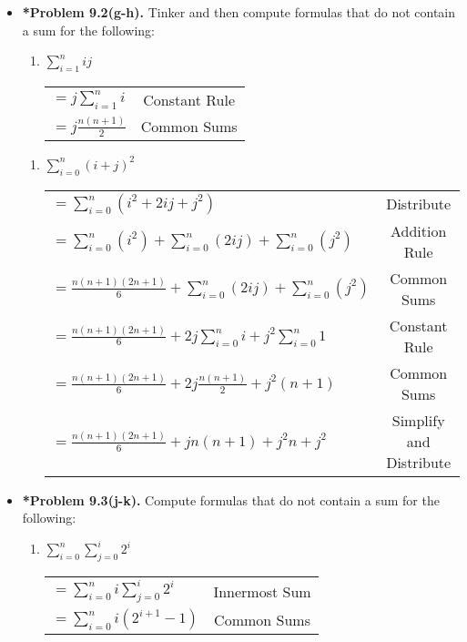 \documentclass[11pt]{article}
\begin{document}
\begin{itemize}
  \item \textbf{*Problem 9.2(g-h).} Tinker and then compute formulas that do not contain a sum for the following:
  \begin{enumerate}[label=(g)]
    \item $\displaystyle \sum_{i=1}^n ij$\\
    \begin{tabular}{l c}
      $= \displaystyle j\sum_{i=1}^n i$ & Constant Rule\\[0.25in]
      $= j \frac{n(n+1)}{2}$ & Common Sums
    \end{tabular}
  \end{enumerate}
  \begin{enumerate}[label=(h)]
    \item $\displaystyle \sum_{i=0}^n (i+j)^2$\\
    \begin{tabular}{l c}
      $= \displaystyle \sum_{i=0}^n (i^2 + 2ij + j^2)$ & Distribute \\[0.25in]
      $= \displaystyle \sum_{i=0}^n (i^2) + \displaystyle \sum_{i=0}^n (2ij) + \displaystyle \sum_{i=0}^n (j^2)$ & Addition Rule\\[0.25in]
      $= \frac{n(n+1)(2n+1)}{6} + \displaystyle \sum_{i=0}^n (2ij) + \displaystyle \sum_{i=0}^n (j^2)$ & Common Sums\\[0.25in]
      $= \frac{n(n+1)(2n+1)}{6} + 2j \displaystyle \sum_{i=0}^n i + j^2 \displaystyle \sum_{i=0}^n 1$ & Constant Rule\\[0.25in]
      $= \frac{n(n+1)(2n+1)}{6} + 2j\frac{n(n+1)}{2} + j^2(n+1)$ & Common Sums\\[0.25in]
      $= \frac{n(n+1)(2n+1)}{6} + jn(n+1) + j^2n+j^2$ & Simplify and Distribute\\[0.25in]
    \end{tabular}
  \end{enumerate}
  \item \textbf{*Problem 9.3(j-k).} Compute formulas that do not contain a sum for the following:
  \begin{enumerate}[label=(j)]
    \item $\displaystyle \sum_{i = 0}^n \displaystyle \sum_{j=0}^i 2^i$\\
    \begin{tabular}{l c}
      $= \displaystyle \sum_{i=0}^n i \displaystyle \sum_{j=0}^i 2^i$ & Innermost Sum\\[0.25in]
      $= \displaystyle \sum_{i=0}^n i (2^{i+1} - 1)$ & Common Sums \\[0.25in]

\end{tabular}
\end{enumerate}
\end{itemize}
\end{document}

